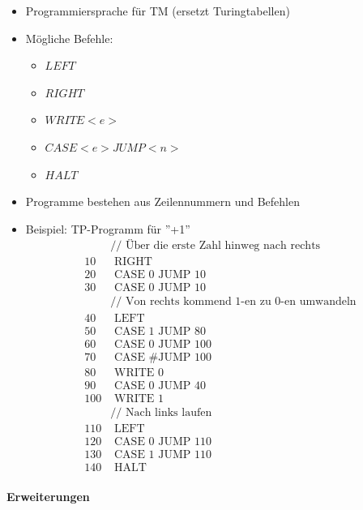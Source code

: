 \documentclass{scrartcl}
\begin{document}
\begin{itemize}
	\item Programmiersprache für TM (ersetzt Turingtabellen)
	\item Mögliche Befehle:
	\begin{itemize}
		\item $LEFT$
		\item $RIGHT$
		\item $WRITE <e>$
		\item $CASE <e> JUMP <n>$
		\item $HALT$
	\end{itemize}
	\item Programme bestehen aus Zeilennummern und Befehlen
	\item Beispiel: TP-Programm für ''+1''
	\begin{align*}
		& \text{// Über die erste Zahl hinweg nach rechts} \\
		10 & \text{ RIGHT} \\
		20 & \text{ CASE 0 JUMP 10} \\
		30 & \text{ CASE 0 JUMP 10} \\
		& \text{// Von rechts kommend 1-en zu 0-en umwandeln} \\
		40 & \text{ LEFT} \\
		50 & \text{ CASE 1 JUMP 80} \\
		60 & \text{ CASE 0 JUMP 100} \\
		70 & \text{ CASE \# JUMP 100} \\
		80 & \text{ WRITE 0} \\
		90 & \text{ CASE 0 JUMP 40} \\
		100 & \text{ WRITE 1} \\
		& \text{// Nach links laufen} \\
		110 & \text{ LEFT} \\
		120 & \text{ CASE 0 JUMP 110} \\
		130 & \text{ CASE 1 JUMP 110} \\
		140 & \text{ HALT}
	\end{align*}		
\end{itemize}

\paragraph{Erweiterungen}
\end{document}

